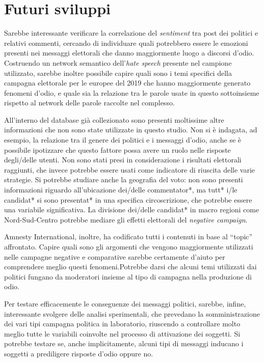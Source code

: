 \section{Futuri sviluppi}
Sarebbe interessante verificare la correlazione del \textit{sentiment} tra post dei politici e relativi commenti, cercando di individuare quali potrebbero essere le emozioni presenti nei messaggi elettorali che danno maggiormente luogo a discorsi d'odio. Costruendo un network semantico dell'\textit{hate speech} presente nel campione utilizzato, sarebbe inoltre possibile capire quali sono i temi specifici della campagna elettorale per le europee del 2019 che hanno maggiormente generato fenomeni d'odio, e quale sia la relazione tra le parole usate in questo sottoinsieme rispetto al network delle parole raccolte nel complesso.

All’interno del database già collezionato sono presenti moltissime altre informazioni che non sono state utilizzate in questo studio. Non si è indagata, ad esempio, la relazione tra il genere dei politici e i messaggi d’odio, anche se è possibile ipotizzare che questo fattore possa avere un ruolo nelle risposte degli/delle utenti. Non sono stati presi in considerazione i risultati elettorali raggiunti, che invece potrebbe essere usati come indicatore di riuscita delle varie strategie. Si potrebbe studiare anche la geografia del voto: non sono presenti informazioni riguardo all’ubicazione dei/delle commentator*, ma tutt* i/le candidat* si sono presentat* in una specifica circoscrizione, che potrebbe essere una variabile significativa. La divisione dei/delle candidat* in macro regioni come Nord-Sud-Centro potrebbe mediare gli effetti elettorali del \textit{negative campaign}.

Amnesty International, inoltre, ha codificato tutti i contenuti in base al “topic” affrontato. Capire quali sono gli argomenti che vengono maggiormente utilizzati nelle campagne negative e comparative sarebbe certamente d’aiuto per comprendere meglio questi fenomeni.Potrebbe darsi che alcuni temi utilizzati dai politici fungano da moderatori insieme al tipo di campagna nella produzione di odio.

Per testare efficacemente le conseguenze dei messaggi politici, sarebbe, infine, interessante svolgere delle analisi sperimentali, che prevedano la somministrazione dei vari tipi campagna politica in laboratorio, riuscendo a controllare molto meglio tutte le variabili coinvolte nel processo di attivazione dei soggetti. Si potrebbe testare se, anche implicitamente, alcuni tipi di messaggi inducano i soggetti a prediligere risposte d’odio oppure no.